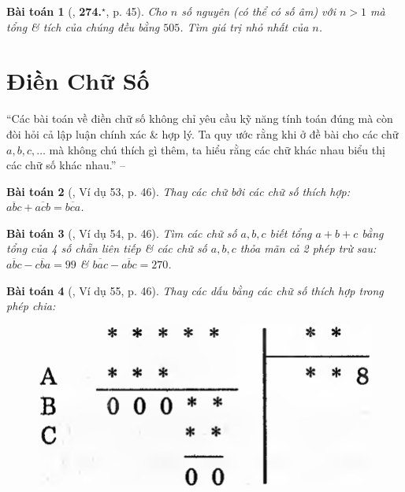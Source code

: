 \documentclass{article}
\numberwithin{equation}{section}
\newtheorem{baitoan}{Bài toán}
\begin{document}
\begin{baitoan}[\cite{Binh_Toan_6_tap_1}, \textbf{274.}${}^\star$, p. 45]
	Cho $n$ số nguyên (có thể có số âm) với $n > 1$ mà tổng \& tích của chúng đều bằng $505$. Tìm giá trị nhỏ nhất của $n$.
\end{baitoan}


\section{Điền Chữ Số}
``Các bài toán về điền chữ số không chỉ yêu cầu kỹ năng tính toán đúng mà còn đòi hỏi cả lập luận chính xác \& hợp lý. Ta quy ước rằng khi ở đề bài cho các chữ $a,b,c,\ldots$ mà không chú thích gì thêm, ta hiểu rằng các chữ khác nhau biểu thị các chữ số khác nhau.'' -- \cite[p. 46]{Binh_Toan_6_tap_1}

\begin{baitoan}[\cite{Binh_Toan_6_tap_1}, Ví dụ 53, p. 46]
	Thay các chữ bởi các chữ số thích hợp: $\overline{abc} + \overline{acb} = \overline{bca}$.
\end{baitoan}

\begin{baitoan}[\cite{Binh_Toan_6_tap_1}, Ví dụ 54, p. 46]
	Tìm các chữ số $a,b,c$ biết tổng $a + b + c$ bằng tổng của 4 số chẵn liên tiếp \& các chữ số $a,b,c$ thỏa mãn cả 2 phép trừ sau: $\overline{abc} - \overline{cba} = 99$ \& $\overline{bac} - \overline{abc} = 270$.
\end{baitoan}

\begin{baitoan}[\cite{Binh_Toan_6_tap_1}, Ví dụ 55, p. 46]
	Thay các dấu {\bf*} bằng các chữ số thích hợp trong phép chia:
	\begin{figure}[H]
		\centering
		\includegraphics[scale=0.13]{Binh_vi_du_55_p_47}
	\end{figure}
\end{baitoan}
\end{document}
